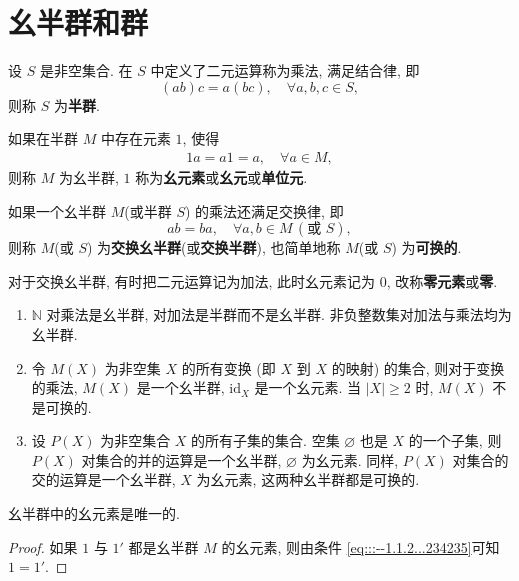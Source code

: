 \documentclass[../../main.tex]{subfiles}%
\begin{document}
\section{幺半群和群}

\begin{definition}[(幺)半群]
设 \( S \) 是非空集合. 在 \( S \) 中定义了二元运算称为乘法, 满足结合律, 即
\[
(ab)c = a(bc),\quad \forall a,b,c \in S ,
\]
则称 \( S \) 为\textbf{半群}.

如果在半群 \( M \) 中存在元素 \( 1 \), 使得
\begin{align}
1a = a1 = a,\quad \forall a \in M,\label{eq:::--1.1.2...234235}
\end{align}
则称 \( M \) 为幺半群, \( 1 \) 称为\textbf{幺元素}或\textbf{幺元}或\textbf{单位元}.

如果一个幺半群 \( M \)(或半群 \( S \)) 的乘法还满足交换律, 即
\[
ab = ba,\quad \forall a,b \in M \, (\text{或 } S) ,
\]
则称 \( M \)(或 \( S \)) 为\textbf{交换幺半群}(或\textbf{交换半群}), 也简单地称 \( M \)(或 \( S \)) 为\textbf{可换的}.

对于交换幺半群, 有时把二元运算记为加法, 此时幺元素记为 \( 0 \), 改称\textbf{零元素}或\textbf{零}.
\end{definition}

\begin{example}\label{example:抽象代数-例题1.2.2}
\begin{enumerate}[(1)]
\item \( \mathbb{N} \) 对乘法是幺半群, 对加法是半群而不是幺半群. 非负整数集对加法与乘法均为幺半群.

\item 令 \( M(X) \) 为非空集 \( X \) 的所有变换 (即 \( X \) 到 \( X \) 的映射) 的集合, 则对于变换的乘法, \( M(X) \) 是一个幺半群, \( \text{id}_X \) 是一个幺元素. 当 \( |X| \geqslant 2 \) 时, \( M(X) \) 不是可换的.

\item 设 \( P(X) \) 为非空集合 \( X \) 的所有子集的集合. 空集 \( \varnothing \) 也是 \( X \) 的一个子集, 则 \( P(X) \) 对集合的并的运算是一个幺半群, \( \varnothing \) 为幺元素. 同样, \( P(X) \) 对集合的交的运算是一个幺半群, \( X \) 为幺元素, 这两种幺半群都是可换的.
\end{enumerate}
\end{example}

\begin{proposition}
幺半群中的幺元素是唯一的.
\end{proposition}
\begin{proof}

如果 \( 1 \) 与 \( 1' \) 都是幺半群 \( M \) 的幺元素, 则由条件 \eqref{eq:::--1.1.2...234235}可知 \( 1 = 1' \). 

\end{proof}
\end{document}
